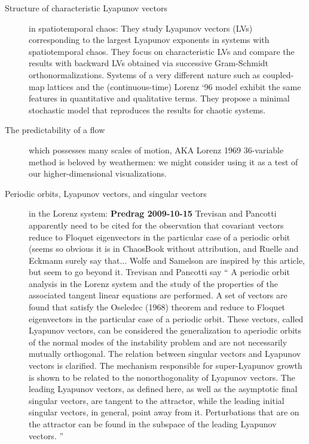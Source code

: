 \begin{description}
\item[Structure of characteristic {L}yapunov vectors]
in spatiotemporal chaos:
They study Lyapunov vectors (LVs) corresponding to
the largest Lyapunov exponents in systems with spatiotemporal
chaos. They focus on characteristic LVs and compare the results
with backward LVs obtained via successive Gram-Schmidt
orthonormalizations. Systems of a very different nature such
as coupled-map lattices and the (continuous-time) Lorenz `96
model exhibit the same features in quantitative and
qualitative terms. They propose a minimal
stochastic model that reproduces the results for chaotic
systems.

\item[The predictability of a flow] which possesses
                many scales of motion,
AKA Lorenz 1969 36-variable method is beloved by weathermen:
we might consider using it as a test of our higher-dimensional
visualizations.

\item[Periodic orbits, Lyapunov vectors, and singular
    vectors] in the Lorenz system:
{\bf Predrag 2009-10-15} Trevisan and Pancotti apparently
need to be cited for the observation that covariant vectors
reduce to Floquet eigenvectors in the particular case of a
periodic orbit (seems so obvious it is in ChaosBook without
attribution, and Ruelle and Eckmann surely say
that... Wolfe and Samelson are inspired by this
article, but seem to go beyond it. Trevisan and Pancotti say
``
A periodic orbit analysis in the Lorenz system
and the study of the properties of the associated tangent
linear equations are performed. A set of vectors are found
that satisfy the Oseledec (1968) theorem and reduce to
Floquet eigenvectors in the particular case of a periodic
orbit. These vectors, called Lyapunov vectors, can be
considered the generalization to aperiodic orbits of the
normal modes of the instability problem and are not
necessarily mutually orthogonal. The relation between
singular vectors and Lyapunov vectors is clarified. The
mechanism responsible for super-Lyapunov growth is shown to
be related to the nonorthogonality of Lyapunov vectors. The
leading Lyapunov vectors, as defined here, as well as the
asymptotic final singular vectors, are tangent to the
attractor, while the leading initial singular vectors, in
general, point away from it. Perturbations that are on the
attractor can be found in the subspace of the leading
Lyapunov vectors.
    ''


\end{description}
